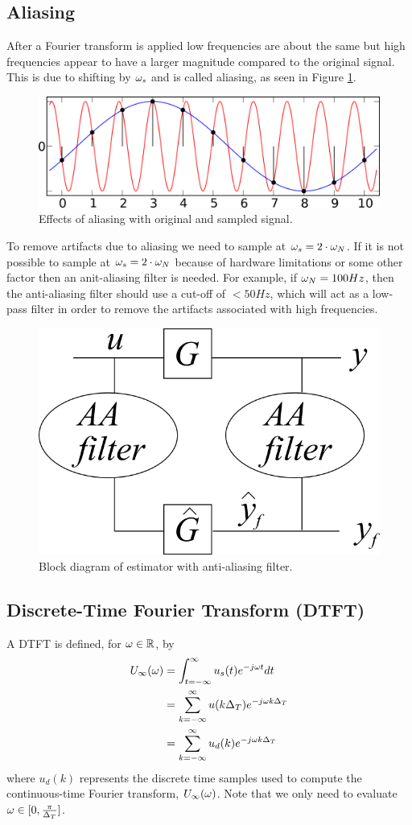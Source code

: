 \subsection{Aliasing}
After a Fourier transform is applied low frequencies are about the same but high frequencies appear to have a larger magnitude compared to the original signal. This is due to shifting by $\omega_s$ and is called aliasing, as seen in Figure \ref{fig:02aliasingSines}.
\begin{figure}[ht!]
	\centering
	\includegraphics[width=.5\textwidth]{images/02aliasingSines}
	\caption{Effects of aliasing with original and sampled signal.}
	\label{fig:02aliasingSines}
\end{figure}

To remove artifacts due to aliasing we need to sample at $\omega_s = 2\cdot\omega_N$. If it is not possible to sample at $\omega_s = 2\cdot\omega_N$ because of hardware limitations or some other factor then an anit-aliasing filter is needed. For example, if $\omega_N = 100 Hz$, then the anti-aliasing filter should use a cut-off of $< 50 Hz$, which will act as a low-pass filter in order to remove the artifacts associated with high frequencies.
\begin{figure}[ht!]
	\centering
	\includegraphics[width=.4\textwidth]{images/02aafilter}
	\caption{Block diagram of estimator with anti-aliasing filter.}
	\label{fig:02aafilter}
\end{figure}

\subsection{Discrete-Time Fourier Transform (DTFT)}
A DTFT is defined, for $\omega\in\mathbb{R}$, by
\begin{align*}
U_\infty(\omega) &= \int_{t=-\infty}^\infty u_s(t)e^{-j\omega t} dt \\
&= \sum_{k=-\infty}^\infty u(k\Delta_T) e^{-j\omega k\Delta_T} \\
&= \sum_{k=-\infty}^\infty u_d(k) e^{-j\omega k\Delta_T}
\end{align*}
where $u_d(k)$ represents the discrete time samples used to compute the continuous-time Fourier transform, $U_\infty(\omega)$. Note that we only need to evaluate $\omega\in[0, \frac{\pi}{\Delta_T}]$.

